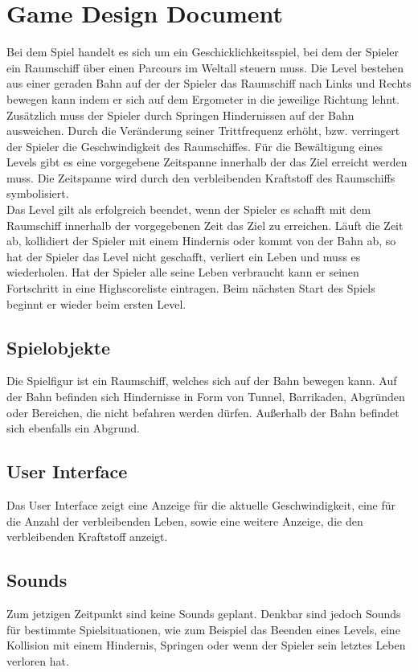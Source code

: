 \chapter{Game Design Document}
Bei dem Spiel handelt es sich um ein Geschicklichkeitsspiel, bei dem der Spieler ein Raumschiff über einen Parcours im Weltall steuern muss. Die Level bestehen aus einer geraden Bahn auf der der Spieler das Raumschiff nach Links und Rechts bewegen kann indem er sich auf dem Ergometer in die jeweilige Richtung lehnt. Zusätzlich muss der Spieler durch Springen Hindernissen auf der Bahn ausweichen. Durch die Veränderung seiner Trittfrequenz erhöht, bzw. verringert der Spieler die Geschwindigkeit des Raumschiffes. Für die Bewältigung eines Levels gibt es eine vorgegebene Zeitspanne innerhalb der das Ziel erreicht werden muss. Die Zeitspanne wird durch den verbleibenden Kraftstoff des Raumschiffs symbolisiert.\\
Das Level gilt als erfolgreich beendet, wenn der Spieler es schafft mit dem Raumschiff innerhalb der vorgegebenen Zeit das Ziel zu erreichen. Läuft die Zeit ab, kollidiert der Spieler mit einem Hindernis oder kommt von der Bahn ab, so hat der Spieler das Level nicht geschafft, verliert ein Leben und muss es wiederholen. Hat der Spieler alle seine Leben verbraucht kann er seinen Fortschritt in eine Highscoreliste eintragen. Beim nächsten Start des Spiels beginnt er wieder beim ersten Level.

\section{Spielobjekte}
Die Spielfigur ist ein Raumschiff, welches sich auf der Bahn bewegen kann. Auf der Bahn befinden sich Hindernisse in Form von Tunnel, Barrikaden, Abgründen oder Bereichen, die nicht befahren werden dürfen. Außerhalb der Bahn befindet sich ebenfalls ein Abgrund.

\section{User Interface}
Das User Interface zeigt eine Anzeige für die aktuelle Geschwindigkeit, eine für die Anzahl der verbleibenden Leben, sowie eine weitere Anzeige, die den verbleibenden Kraftstoff anzeigt.

\section{Sounds}
Zum jetzigen Zeitpunkt sind keine Sounds geplant. Denkbar sind jedoch Sounds für bestimmte Spielsituationen, wie zum Beispiel das Beenden eines Levels, eine Kollision mit einem Hindernis, Springen oder wenn der Spieler sein letztes Leben verloren hat.

